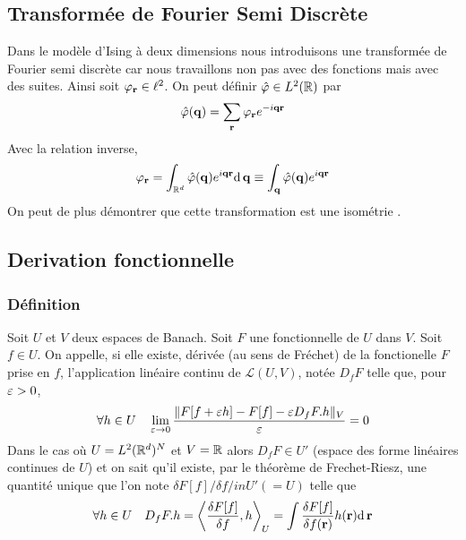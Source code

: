 \documentclass[10pt]{article}
\begin{document}
\begin{multicols}{2}
\vspace*{11pt}



\subsection{Transformée de Fourier Semi Discrète}

Dans le modèle d'Ising à deux dimensions nous introduisons une transformée de Fourier semi discrète car nous travaillons non pas avec des fonctions mais avec des suites. Ainsi soit $\varphi_{\bf r} \in \ell^2$. On peut définir $\hat{\varphi} \in L^2(\mathbb{R})$ par  
\begin{equation}
  \hat{\varphi}({\bf q}) = \sum_{\bf r} \varphi_{\bf r} e^{-i{\bf q}{\bf r}}
\end{equation}
  Avec la relation inverse,
\begin{equation}
 \varphi_{\bf r} = \int_{\mathbb{R}^d} \hat{\varphi}({\bf q})  e^{i{\bf q}{\bf r}} \text{d}\, {\bf q} \equiv \int_{\bf q} \hat{\varphi}({\bf q})  e^{i{\bf q}{\bf r}}
\end{equation}
On peut de plus démontrer que cette transformation est une isométrie \cite{}.



\vspace*{11pt}
\subsection{Derivation fonctionnelle}

\subsubsection{Définition}
Soit $U$ et $V$ deux espaces de Banach. Soit $F$ une fonctionnelle de $U$ dans $V$. 
Soit $f \in U$. On appelle, si elle existe, dérivée (au sens de Fréchet) de la fonctionelle $F$ prise en $f$, l'application linéaire continu de $\mathcal{L}(U,V)$, notée $D_fF$ telle que, pour $\varepsilon>0$, 
\begin{equation}
\forall h \in U \quad \lim_{ \varepsilon \rightarrow 0 } \frac{\| F[f+\varepsilon h] - F[f] - \varepsilon D_fF.h\|_V}{\varepsilon}  = 0
\end{equation} 
Dans le cas où $U = L^2(\mathbb{R}^d)^N$ et $V = \mathbb{R}$ alors $D_fF \in U'$ (espace des forme linéaires continues de $U$) et on sait qu'il existe, par le théorème de Frechet-Riesz, une quantité unique que l'on note $\delta F[f]/\delta f /in U'(=U)$ telle que 
\begin{equation}
\forall h \in U \quad D_f F.h = {\left< \frac{\delta F[f]}{\delta f}, h \right>}_{U} = \int \frac{\delta F[f]}{\delta f({\bf r})} h({\bf r}) \text{d} \, {\bf r}	
\end{equation}


\end{multicols}
\end{document}
